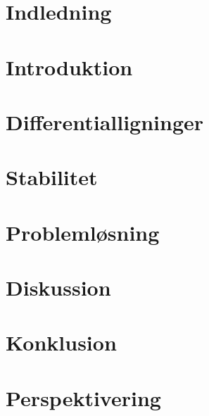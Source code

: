 

 



\chapter{Indledning}
    

\chapter{Introduktion}
    

\chapter{Differentialligninger}
    






\chapter{Stabilitet}
    

\chapter{Problemløsning}
    

\chapter{Diskussion}
    
    
\chapter{Konklusion}
    

\chapter{Perspektivering}
    





